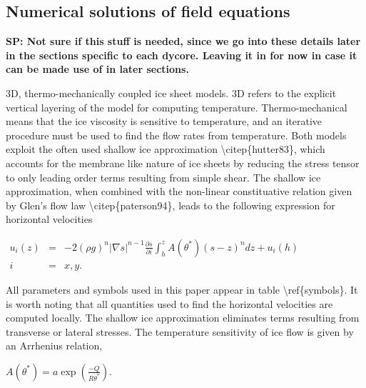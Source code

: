 






\subsection{Numerical solutions of field equations}
\textbf{SP: Not sure if this stuff is needed, since we go into these details later in the sections specific to each
dycore. Leaving it in for now in case it can be made use of in later sections.}

3D, thermo-mechanically coupled ice sheet models. 3D refers to the
explicit vertical layering of the model for computing temperature.
Thermo-mechanical means that the ice viscosity is sensitive to
temperature, and an iterative procedure must be used to find the flow
rates from temperature. Both models exploit the often used shallow ice
approximation \textbackslash{}citep\{hutter83\}, which accounts for the
membrane like nature of ice sheets by reducing the stress tensor to only
leading order terms resulting from simple shear. The shallow ice
approximation, when combined with the non-linear constituative relation
given by Glen's flow law \textbackslash{}citep\{paterson94\}, leads to
the following expression for horizontal velocities

$\begin{matrix}
u_i(z) &=& -2 (\rho g)^n \vert \nabla s\vert ^{n-1} \frac{\partial s}{\partial i} 
\int_h^z A(\theta^*)(s-z)^n dz + u_i(h)\\
i &=& x,y.
\end{matrix}$

All parameters and symbols used in this paper appear in table
\textbackslash{}ref\{symbols\}. It is worth noting that all quantities
used to find the horizontal velocities are computed locally. The shallow
ice approximation eliminates terms resulting from transverse or lateral
stresses. The temperature sensitivity of ice flow is given by an
Arrhenius relation,

$
A(\theta^*) = a \exp \left(\frac{-Q}{R\theta^*}\right).
$

